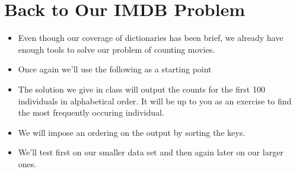 \documentclass[letterpaper,10pt,english]{sphinxmanual}
\begin{document}
\section{Back to Our IMDB Problem}
\label{\detokenize{lecture_notes/lec16_dictionaries1:back-to-our-imdb-problem}}\begin{itemize}
\item {} 
Even though our coverage of dictionaries has been brief, we already
have enough tools to solve our problem of counting movies.

\item {} 
Once again we’ll use the following as a starting point

%
\begin{sphinxVerbatim}[commandchars=\\\{\}]
  
  
      
      
      \PYG{p}{[}\PYG{p}{]}
\end{sphinxVerbatim}

\item {} 
The solution we give in class will output the counts for the first
100 individuals in alphabetical order.  It will be up to you as an
exercise to find the most frequently occuring individual.

\item {} 
We will impose an ordering on the output by sorting the keys.

\item {} 
We’ll test first on our smaller data set and then again later on our
larger ones.

\end{itemize}
\end{document}
